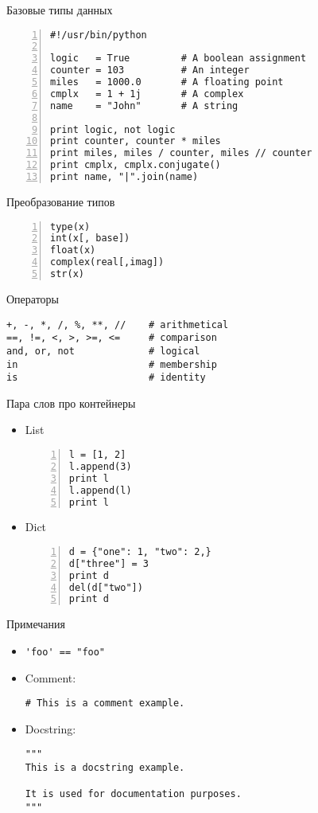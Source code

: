 \documentclass[hyperref={pdftex,unicode}]{beamer}
\begin{document}
\begin{frame}[fragile]{Базовые типы данных}
  \begin{lstlisting}[numbers=left]
#!/usr/bin/python

logic   = True         # A boolean assignment
counter = 103          # An integer 
miles   = 1000.0       # A floating point
cmplx   = 1 + 1j       # A complex 
name    = "John"       # A string

print logic, not logic
print counter, counter * miles
print miles, miles / counter, miles // counter
print cmplx, cmplx.conjugate()
print name, "|".join(name)
\end{lstlisting}
\end{frame}

\begin{frame}[fragile]{Преобразование типов}
  \begin{lstlisting}[numbers=left]
type(x)
int(x[, base])
float(x)
complex(real[,imag])
str(x)
\end{lstlisting}
\end{frame}

\begin{frame}[fragile]{Операторы}
\begin{lstlisting}
+, -, *, /, %, **, //    # arithmetical
==, !=, <, >, >=, <=     # comparison
and, or, not             # logical
in                       # membership
is                       # identity
\end{lstlisting}
\end{frame}

\begin{frame}[fragile]{Пара слов про контейнеры}
  \begin{itemize}
  \item<1-> List
    \begin{lstlisting}[numbers=left]
l = [1, 2]
l.append(3)
print l
l.append(l)
print l
    \end{lstlisting}
  \item<2-> Dict
    \begin{lstlisting}[numbers=left]
d = {"one": 1, "two": 2,}
d["three"] = 3
print d
del(d["two"])
print d
    \end{lstlisting}
  \end{itemize}
\end{frame}

\begin{frame}[fragile]{Примечания}
  \begin{itemize}
    \item \lstinline$'foo' == "foo"$

    \item Comment:
      \begin{lstlisting}
# This is a comment example.
      \end{lstlisting}

    \item Docstring:
      \begin{lstlisting}
"""
This is a docstring example.

It is used for documentation purposes.
"""
      \end{lstlisting}
  \end{itemize}
\end{frame}
\end{document}

